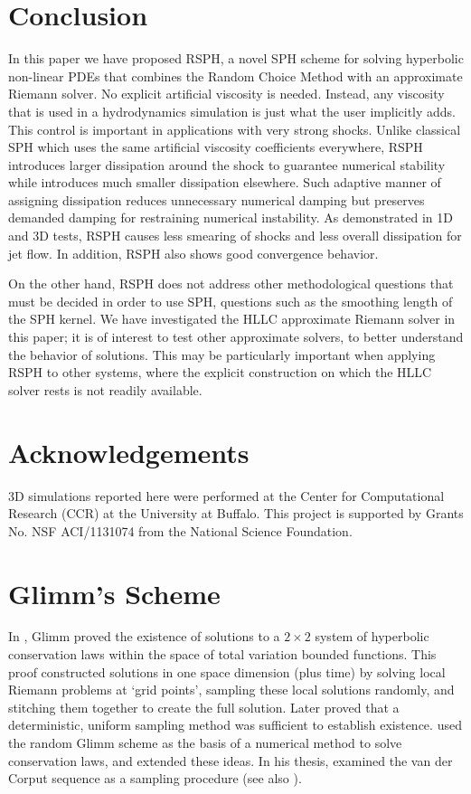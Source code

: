 \documentclass[review]{elsarticle}
\begin{document}
\section{Conclusion} \label{discussion}
In this paper we have proposed RSPH, a novel SPH scheme for solving hyperbolic non-linear PDEs that combines the Random Choice Method with an approximate Riemann solver. No explicit artificial viscosity is needed. Instead, any viscosity that is used in a hydrodynamics simulation is just what the user implicitly adds. 
This control is important in applications with very strong shocks. 
Unlike classical SPH which uses the same artificial viscosity coefficients everywhere, RSPH introduces larger dissipation around the shock to guarantee numerical stability while introduces much smaller dissipation elsewhere. Such adaptive manner of assigning dissipation reduces unnecessary numerical damping but preserves demanded damping for restraining numerical instability. As demonstrated in 1D and 3D tests, RSPH causes less smearing of shocks and less overall dissipation for jet flow.
In addition, RSPH also shows good convergence behavior.

On the other hand, RSPH does not address other methodological questions that must be decided in order to use SPH, questions such as the smoothing length of the SPH kernel. We have investigated the HLLC approximate Riemann solver in this paper; it is of interest to test other approximate solvers, to better understand the behavior of solutions. This may be particularly important when applying RSPH to other systems, where the explicit construction on which the HLLC solver rests is not readily available.

\section*{Acknowledgements}
3D simulations reported here were performed at the Center for Computational Research (CCR) at the University at Buffalo. This project is supported by Grants No. NSF ACI/1131074 from the National Science Foundation.

\appendix
\section{Glimm\rq{}s Scheme}
In \citep{glimm1965solutions}, Glimm proved the existence  of solutions to a  $2\times2$ 
system of hyperbolic conservation laws within the space of total variation bounded functions. 
This proof constructed solutions in one space dimension (plus time) by solving local Riemann problems at `grid points\rq{}, sampling these local solutions randomly, and stitching them together to create the full solution.  Later \citet{liu1977deterministic} proved that a deterministic, uniform sampling 
method was sufficient to establish existence. \citet{chorin1976random} used
the random Glimm scheme as the basis of a numerical method to solve conservation laws, and
\citet{concus1979numerical} extended these ideas.
In his thesis, \citet{colella1978analysis} examined the van der Corput sequence as a sampling procedure (see also \cite{colella1982glimm}).
\end{document}
